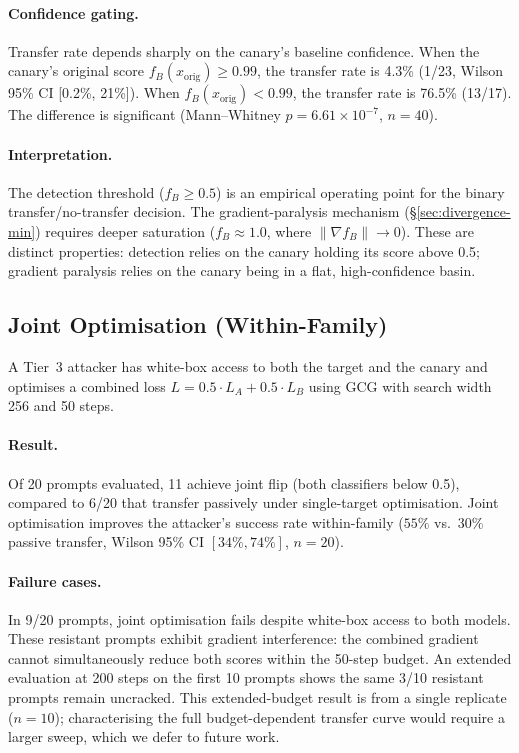 \paragraph{Confidence gating.} Transfer rate depends sharply on the canary's baseline confidence. When the canary's original score $f_B(x_{\text{orig}}) \geq 0.99$, the transfer rate is 4.3\% (1/23, Wilson 95\% CI [0.2\%, 21\%]). When $f_B(x_{\text{orig}}) < 0.99$, the transfer rate is 76.5\% (13/17). The difference is significant (Mann--Whitney $p = 6.61 \times 10^{-7}$, $n = 40$).

\paragraph{Interpretation.} The detection threshold ($f_B \geq 0.5$) is an empirical operating point for the binary transfer/no-transfer decision. The gradient-paralysis mechanism (\S\ref{sec:divergence-min}) requires deeper saturation ($f_B \approx 1.0$, where $\|\nabla f_B\| \to 0$). These are distinct properties: detection relies on the canary holding its score above 0.5; gradient paralysis relies on the canary being in a flat, high-confidence basin.

\subsection{Joint Optimisation (Within-Family)}
\label{sec:joint-gcg}

A Tier~3 attacker has white-box access to both the target and the canary and optimises a combined loss $L = 0.5 \cdot L_A + 0.5 \cdot L_B$ using GCG with search width 256 and 50 steps.

\paragraph{Result.} Of 20 prompts evaluated, 11 achieve joint flip (both classifiers below 0.5), compared to 6/20 that transfer passively under single-target optimisation. Joint optimisation improves the attacker's success rate within-family ($55\%$ vs.\ $30\%$ passive transfer, Wilson 95\% CI $[34\%, 74\%]$, $n = 20$).

\paragraph{Failure cases.} In 9/20 prompts, joint optimisation fails despite white-box access to both models. These resistant prompts exhibit gradient interference: the combined gradient cannot simultaneously reduce both scores within the 50-step budget. An extended evaluation at 200 steps on the first 10 prompts shows the same 3/10 resistant prompts remain uncracked. This extended-budget result is from a single replicate ($n = 10$); characterising the full budget-dependent transfer curve would require a larger sweep, which we defer to future work.

